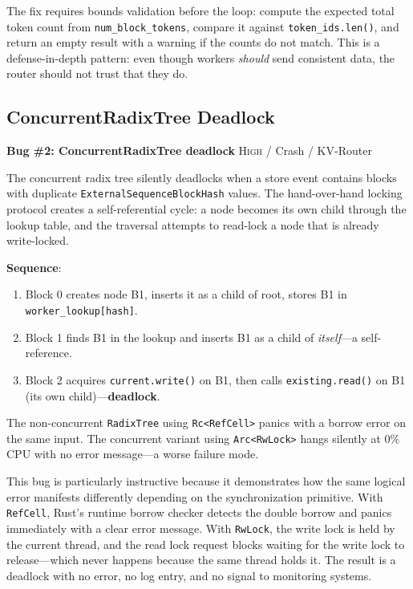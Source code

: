 The fix requires bounds validation before the loop: compute the expected total token count from \texttt{num\_block\_tokens}, compare it against \texttt{token\_ids.len()}, and return an empty result with a warning if the counts do not match. This is a defense-in-depth pattern: even though workers \emph{should} send consistent data, the router should not trust that they do.

\subsection{ConcurrentRadixTree Deadlock}

\begin{bugbox}
\textbf{Bug \#2: ConcurrentRadixTree deadlock} \hfill \textsc{High} / Crash / KV-Router

The concurrent radix tree silently deadlocks when a store event contains blocks with duplicate \texttt{ExternalSequenceBlockHash} values. The hand-over-hand locking protocol creates a self-referential cycle: a node becomes its own child through the lookup table, and the traversal attempts to read-lock a node that is already write-locked.

\medskip
\textbf{Sequence}:
\begin{enumerate}
\item Block 0 creates node B1, inserts it as a child of root, stores B1 in \texttt{worker\_lookup[hash]}.
\item Block 1 finds B1 in the lookup and inserts B1 as a child of \emph{itself}---a self-reference.
\item Block 2 acquires \texttt{current.write()} on B1, then calls \texttt{existing.read()} on B1 (its own child)---\textbf{deadlock}.
\end{enumerate}

The non-concurrent \texttt{RadixTree} using \texttt{Rc<RefCell>} panics with a borrow error on the same input. The concurrent variant using \texttt{Arc<RwLock>} hangs silently at 0\% CPU with no error message---a worse failure mode.
\end{bugbox}

This bug is particularly instructive because it demonstrates how the same logical error manifests differently depending on the synchronization primitive. With \texttt{RefCell}, Rust's runtime borrow checker detects the double borrow and panics immediately with a clear error message. With \texttt{RwLock}, the write lock is held by the current thread, and the read lock request blocks waiting for the write lock to release---which never happens because the same thread holds it. The result is a deadlock with no error, no log entry, and no signal to monitoring systems.

